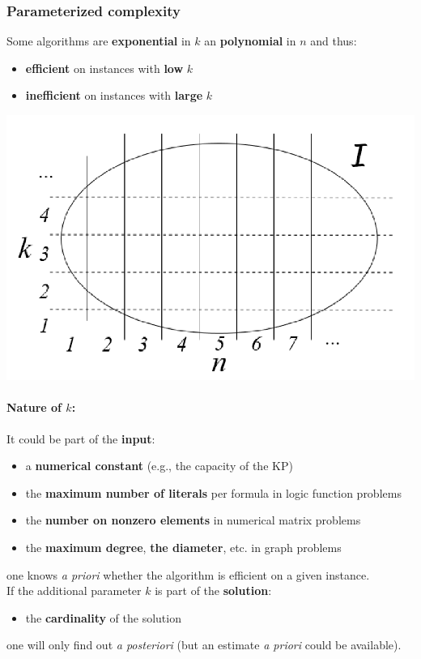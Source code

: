 \subsubsection{Parameterized complexity}
Some algorithms are \textbf{exponential} in $k$ an \textbf{polynomial} in $n$ and thus: 
\begin{itemize}
	\item \textbf{efficient} on instances with \textbf{low} $k$
	\item \textbf{inefficient} on instances with \textbf{large} $k$
\end{itemize}
\begin{center}
	\includegraphics[width=0.5\columnwidth]{img/PC1}
\end{center}

\newpage

\paragraph{Nature of $k$:} It could be part of the \textbf{input}: 
\begin{itemize}
	\item a \textbf{numerical constant} (e.g., the capacity of the KP)
	\item the \textbf{maximum number of literals} per formula in logic function problems
	\item the \textbf{number on nonzero elements} in numerical matrix problems
	\item the \textbf{maximum degree}, \textbf{the diameter}, etc. in graph problems
\end{itemize}
one knows \textit{a priori} whether the algorithm is efficient on a given instance.\\

If the additional parameter $k$ is part of the \textbf{solution}: 
\begin{itemize}
	\item the \textbf{cardinality} of the solution
\end{itemize}
one will only find out \textit{a posteriori} (but an estimate \textit{a priori} could be available).\\

